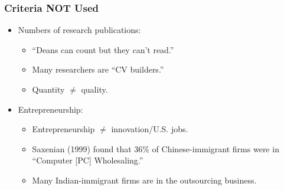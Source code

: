 \documentclass{beamer}
\begin{document}
\begin{frame}
\frametitle{Criteria NOT Used}
\pause

\begin{itemize}

\item Numbers of research publications:
\pause

   \begin{itemize}
    
   \item ``Deans can count but they can't read.''
   \pause

   \item Many researchers are ``CV builders.''
   \pause

   \item Quantity $\neq$ quality.
   \pause

   \end{itemize}

\item Entrepreneurship:
\pause

   \begin{itemize}

   \item Entrepreneurship $\neq$ innovation/U.S. jobs.
   \pause

   \item Saxenian (1999) found that 36\% of Chinese-immigrant
   firms were in ``Computer [PC] Wholesaling.''
   \pause

   \item Many Indian-immigrant firms are in the outsourcing business.

   \end{itemize}

\end{itemize}

\end{frame}
\end{document}
